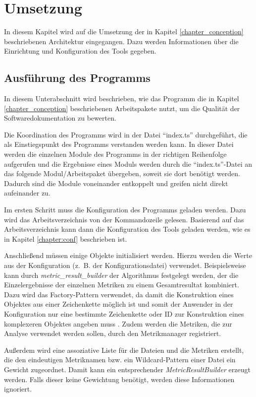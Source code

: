 
\begingroup
\renewcommand{\cleardoublepage}{} %
\renewcommand{\clearpage}{}
\chapter{Umsetzung}\label{chapter:program}
\endgroup
In diesem Kapitel wird auf die Umsetzung der in Kapitel \ref{chapter_conception} beschriebenen Architektur eingegangen. Dazu werden Informationen über die Einrichtung und Konfiguration des Tools gegeben.
\section{Ausführung des Programms}
In diesem Unterabschnitt wird beschrieben, wie das Programm die in Kapitel \ref{chapter_conception}
beschriebenen Arbeitspakete nutzt, um die Qualität der Softwaredokumentation zu bewerten. 

Die Koordination des Programms wird in der Datei \enquote{index.ts} durchgeführt, die als Einstiegspunkt des Programms verstanden werden kann. In dieser Datei werden die einzelnen Module des Programms in der richtigen Reihenfolge aufgerufen und die Ergebnisse eines Moduls werden durch die \enquote{index.ts}-Datei an das folgende Modul/Arbeitspaket übergeben, soweit sie dort benötigt werden. Dadurch sind die Module voneinander entkoppelt und greifen nicht direkt aufeinander zu. 

Im ersten Schritt  muss die Konfiguration des Programms geladen werden. Dazu wird das Arbeitsverzeichnis von der Kommandozeile gelesen. Basierend auf das Arbeitsverzeichnis kann dann die Konfiguration des Tools geladen werden, wie es in Kapitel \ref{chapter:conf} beschrieben ist.  

Anschließend müssen einige Objekte  initialisiert werden. Hierzu werden die Werte aus der Konfiguration (z.~B. der Konfigurationsdatei) verwendet. Beispielsweise kann durch \textit{metric\_result\_builder} der Algorithmus festgelegt werden, der die Einzelergebnisse der einzelnen Metriken zu einem Gesamtresultat kombiniert. Dazu wird das Factory-Pattern verwendet, da damit die Konstruktion eines Objektes aus einer Zeichenkette möglich ist und somit der Anwender in der Konfiguration nur eine bestimmte Zeichenkette oder ID zur Konstruktion eines komplexeren Objektes angeben muss \cite[S. 149 1-161]{gamma2015design}. Zudem werden die Metriken, die zur Analyse verwendet werden sollen, durch den Metrikmanager registriert.

Außerdem wird eine assoziative Liste für die Dateien und die Metriken erstellt, die den eindeutigen Metriknamen bzw. ein Wildcard-Pattern einer Datei ein Gewicht zugeordnet. Damit kann ein entsprechender \textit{MetricResultBuilder} erzeugt werden. Falls dieser keine Gewichtung benötigt, werden diese Informationen ignoriert. 

